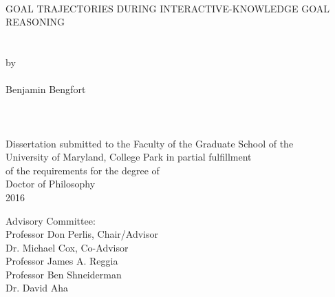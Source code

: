 
\thispagestyle{empty}
\hbox{\ }
\vspace{1in}
\renewcommand{\baselinestretch}{1}
\small\normalsize
\begin{center}

\large{{GOAL TRAJECTORIES DURING INTERACTIVE-KNOWLEDGE GOAL REASONING}}\\
\ \\
\ \\
\large{by} \\
\ \\
\large{Benjamin Bengfort}%
\ \\
\ \\
\ \\
\ \\
\normalsize
Dissertation submitted to the Faculty of the Graduate School of the \\
University of Maryland, College Park in partial fulfillment \\
of the requirements for the degree of \\
Doctor of Philosophy \\
2016
\end{center}

\vspace{7.5em}

\noindent Advisory Committee: \\
Professor Don Perlis, Chair/Advisor \\
Dr. Michael Cox, Co-Advisor \\
Professor James A. Reggia \\
Professor Ben Shneiderman \\
Dr. David Aha
